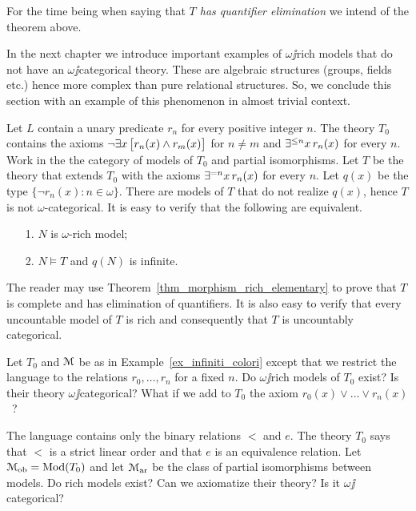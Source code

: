 \documentclass[creche.tex]{subfiles}
\begin{document}
For the time being when saying that \textit{$T$ has quantifier elimination\/} we intend  of the theorem above.

In the next chapter we introduce important examples of $\omega\jj$rich models that do not have an $\omega\jj$categorical theory. These are algebraic structures (groups, fields etc.) hence more complex than pure relational structures. So, we conclude this section with an example of this phenomenon in almost trivial context. 

\begin{example}\label{ex_infiniti_colori}
Let $L$ contain a unary predicate $r_n$ for every positive integer $n$. The theory $T_0$ contains the axioms $\neg\exists x\, \big[r_n(x)\wedge r_m(x)\big]$ for $n\neq m$ and $\exists^{\le n}x\,r_n(x)$ for every $n$. Work in the the category of models of $T_0$ and partial isomorphisms. Let $T$ be the theory that extends $T_0$ with the axioms $\exists^{= n} x\, r_n(x)$ for every  $n$. Let $q(x)$ be the type $\big\{\neg r_n(x):n\in\omega\big\}$. There are models of $T$ that do not realize $q(x)$, hence $T$ is not $\omega$-categorical. It is easy to verify that the following are equivalent.
\begin{itemize}
 \item[1.] $N$ is $\omega$-rich model;
 \item[2.] $N\models T$ and  $q(N)$ is infinite.
\end{itemize}
The reader may use Theorem~\ref{thm_morphism_rich_elementary} to prove that $T$ is complete and has elimination of quantifiers. It is also easy to verify that every uncountable model of $T$ is rich and consequently that $T$ is uncountably categorical.\QED
\end{example}

\begin{exercise}\label{ex_finiti_colori}
Let $T_0$ and $\EuScript M$ be as in Example~\ref{ex_infiniti_colori} except that we restrict the language to the relations $r_0,\dots,r_n$ for a fixed $n$. Do $\omega\jj$rich models of $T_0$ exist? Is their theory $\omega\jj$categorical? What if we add to $T_0$ the axiom $r_0(x)\vee\dots\vee r_n(x)$~?\QED
\end{exercise}

\begin{exercise}
The language contains only the binary relations $<$ and $e$. The theory $T_0$ says that $<$ is a strict linear order and that $e$ is an equivalence relation. Let $\EuScript M_{\rm ob}=\mathop{\rm Mod}(T_0)$ and let $\EuScript M_{\rm ar}$  be the class of partial isomorphisms between models.   Do rich models exist? Can we axiomatize their theory? Is it $\omega\jj$categorical?\QED
\end{exercise}
\end{document}

